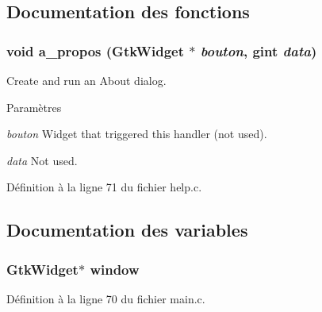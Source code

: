 \subsection{Documentation des fonctions}
\subsubsection[{a\_\-propos}]{\setlength{\rightskip}{0pt plus 5cm}void a\_\-propos (GtkWidget $\ast$ {\em bouton}, \/  gint {\em data})}\label{help_8c_a8236087b365d84362a2c5431468d1ba3}
Create and run an About dialog.


\begin{DoxyParams}{Paramètres}
\item[{\em bouton}]Widget that triggered this handler (not used). \item[{\em data}]Not used. \end{DoxyParams}


Définition à la ligne 71 du fichier help.c.



\subsection{Documentation des variables}
\subsubsection[{window}]{\setlength{\rightskip}{0pt plus 5cm}GtkWidget$\ast$ {\bf window}}\label{help_8c_a3d346c08cf2d67c388caabffb412b293}


Définition à la ligne 70 du fichier main.c.

